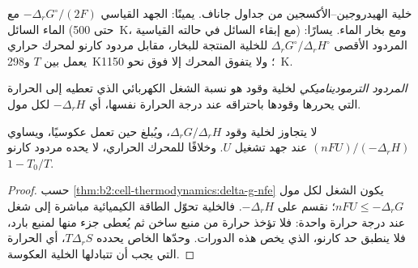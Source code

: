 \begin{omfigure}
{\small خلية الهيدروجين--الأكسجين من جداول جاناف. يمينًا: الجهد القياسي
$-\Delta_r G^\circ/(2F)$ مع الماء السائل (حتى \qty{500}{K}، مع إبقاء السائل
في حالته القياسية) ومع بخار الماء. يسارًا: المردود الأقصى
$\Delta_r G^\circ/\Delta_r H^\circ$ للخلية المنتجة للبخار، مقابل مردود كارنو
لمحرك حراري يعمل بين $T$ و\qty{298}{K}؛ ولا يتفوق المحرك
إلا فوق نحو \qty{1150}{K}.}
\end{omfigure}

\begin{definition}\label{def:b2:cell-thermodynamics:efficiency}
\emph{المردود الترموديناميكي} لخلية
وقود هو نسبة الشغل الكهربائي الذي تعطيه إلى الحرارة التي يحررها
وقودها باحتراقه عند درجة الحرارة نفسها، أي $-\Delta_r H$ لكل مول.
\end{definition}

\begin{proposition}\label{prop:b2:cell-thermodynamics:efficiency}
لا يتجاوز  لخلية وقود $\Delta_r G/\Delta_r H$،
ويُبلغ حين تعمل عكوسيًا، ويساوي $(nFU)/(-\Delta_r H)$ عند جهد
تشغيل $U$. وخلافًا للمحرك الحراري، لا يحده مردود كارنو
$1 - T_0/T$.
\end{proposition}

\begin{proof}
حسب \cref{thm:b2:cell-thermodynamics:delta-g-nfe} يكون الشغل لكل مول $nFU \leq
-\Delta_r G$؛ نقسم على $-\Delta_r H$. فالخلية تحوّل الطاقة الكيميائية مباشرة
إلى شغل عند درجة حرارة واحدة: فلا تؤخذ حرارة من منبع ساخن ثم
يُعطى جزء منها لمنبع بارد، فلا ينطبق حد كارنو، الذي يخص هذه الدورات.
وحدّها الخاص يحدده $T\Delta_r S$، أي الحرارة التي يجب أن تتبادلها الخلية
العكوسة.
\end{proof}

